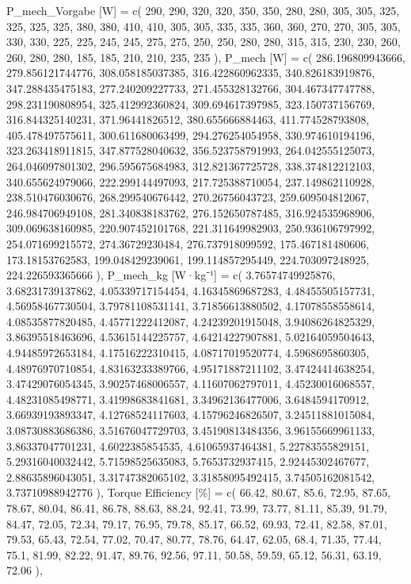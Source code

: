 \documentclass[
  letterpaper,
  DIV=11]{scrartcl}
\newenvironment{Shaded}{\begin{snugshade}}{\end{snugshade}}
\newcommand{\NormalTok}[1]{\textcolor[rgb]{0.00,0.23,0.31}{#1}}
\begin{document}
\begin{Shaded}
\begin{Highlighting}[]
\NormalTok{  \textasciigrave{}P\_mech\_Vorgabe [W]\textasciigrave{} = c( 290, 290, 320, 320, 350, 350, 280, 280, 305, 305, 325, 325, 325, 325, 380, 380, 410, 410, 305, 305, 335, 335, 360, 360, 270, 270, 305, 305, 330, 330, 225, 225, 245, 245, 275, 275, 250, 250, 280, 280, 315, 315, 230, 230, 260, 260, 280, 280, 185, 185, 210, 210, 235, 235 ),}
\NormalTok{  \textasciigrave{}P\_mech [W]\textasciigrave{} = c( 286.196809943666, 279.856121744776, 308.058185037385, 316.422860962335, 340.826183919876, 347.288435475183, 277.240209227733, 271.455328132766, 304.467347747788, 298.231190808954, 325.412992360824, 309.694617397985, 323.150737156769, 316.844325140231, 371.96441826512, 380.655666884463, 411.774528793808, 405.478497575611, 300.611680063499, 294.276254054958, 330.974610194196, 323.263418911815, 347.877528040632, 356.523758791993, 264.042555125073, 264.046097801302, 296.595675684983, 312.821367725728, 338.374812212103, 340.655624979066, 222.299144497093, 217.725388710054, 237.149862110928, 238.510476030676, 268.299540676442, 270.26756043723, 259.609504812067, 246.984706949108, 281.340838183762, 276.152650787485, 316.924535968906, 309.069638160985, 220.907452101768, 221.311649982903, 250.936106797992, 254.071699215572, 274.36729230484, 276.737918099592, 175.467181480606, 173.18153762583, 199.048429239061, 199.114857295449, 224.703097248925, 224.226593365666 ),}
\NormalTok{  \textasciigrave{}P\_mech\_kg [W·kg⁻¹]\textasciigrave{} = c( 3.76574749925876, 3.68231739137862, 4.05339717154454, 4.16345869687283, 4.48455505157731, 4.56958467730504, 3.79781108531141, 3.71856613880502, 4.17078558558614, 4.08535877820485, 4.45771222412087, 4.24239201915048, 3.94086264825329, 3.86395518463696, 4.53615144225757, 4.64214227907881, 5.02164059504643, 4.94485972653184, 4.17516222310415, 4.08717019520774, 4.5968695860305, 4.48976970710854, 4.83163233389766, 4.95171887211102, 3.47424414638254, 3.47429076054345, 3.90257468006557, 4.11607062797011, 4.45230016068557, 4.48231085498771, 3.41998683841681, 3.34962136477006, 3.6484594170912, 3.66939193893347, 4.12768524117603, 4.15796246826507, 3.24511881015084, 3.08730883686386, 3.51676047729703, 3.45190813484356, 3.96155669961133, 3.86337047701231, 4.6022385854535, 4.61065937464381, 5.22783555829151, 5.29316040032442, 5.71598525635083, 5.7653732937415, 2.92445302467677, 2.88635896043051, 3.31747382065102, 3.31858095492415, 3.74505162081542, 3.73710988942776 ),}
\NormalTok{  \textasciigrave{}Torque Efficiency [\%]\textasciigrave{} = c( 66.42, 80.67, 85.6, 72.95, 87.65, 78.67, 80.04, 86.41, 86.78, 88.63, 88.24, 92.41, 73.99, 73.77, 81.11, 85.39, 91.79, 84.47, 72.05, 72.34, 79.17, 76.95, 79.78, 85.17, 66.52, 69.93, 72.41, 82.58, 87.01, 79.53, 65.43, 72.54, 77.02, 70.47, 80.77, 78.76, 64.47, 62.05, 68.4, 71.35, 77.44, 75.1, 81.99, 82.22, 91.47, 89.76, 92.56, 97.11, 50.58, 59.59, 65.12, 56.31, 63.19, 72.06 ),}

\end{Highlighting}
\end{Shaded}
\end{document}

